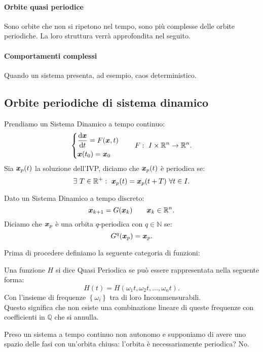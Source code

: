 \paragraph{Orbite quasi periodice}%
\label{par:Orbite quasi periodice}
Sono orbite che non si ripetono nel tempo, sono più complesse delle orbite periodiche. La loro struttura verrà approfondita nel seguito.
\paragraph{Comportamenti complessi}%
\label{par:Comportamenti complessi}
Quando un sistema presenta, ad esempio, caos deterministico.
\subsection{Orbite periodiche di sistema dinamico}%
\label{sub:Orbite periodiche di sistema dinamico}
\begin{defn}
Prendiamo un Sistema Dinamico a tempo continuo:
\[
    \begin{dcases}
	\frac{\text{d} \boldsymbol{x}}{\text{d} t} = F(\boldsymbol{x}, t)\\
	\boldsymbol{x} (t_0) = \boldsymbol{x}_0
    \end{dcases}
    \qquad
    F: \ I \times \mathbb{R}^n \to \mathbb{R}^n
.\] 
 Sia $\boldsymbol{x}_p(t)$ la soluzione dell'IVP, diciamo che $\boldsymbol{x}_p(t)$ è periodica se:
\[
    \exists \ T \in \mathbb{R}^+: \ \boldsymbol{x}_p(t) = \boldsymbol{x}_p (t + T) \  \forall t \in I
.\]    
\end{defn}
\noindent
\begin{defn}
    Dato un Sistema Dinamico a tempo discreto:
    \[
	\boldsymbol{x}_{k+1} = G(\boldsymbol{x}_k) \qquad \boldsymbol{x}_k \in \mathbb{R}^n
    .\] 
    Diciamo che $\boldsymbol{x}_p$ è una orbita $q$-periodica con $q \in \mathbb{N}$ se:
    \[
	G^{q} (\boldsymbol{x}_p) = \boldsymbol{x}_p
    .\] 
\end{defn}
\noindent
Prima di procedere definiamo la seguente categoria di funzioni:
\begin{defn}
    Una funzione $H$ si dice Quasi Periodica se può essere rappresentata nella seguente forma:
    \[
	H(t) = H(\omega_1t, \omega_2t, \ldots, \omega_nt)
    .\] 
    Con l'insieme di frequenze $\left\{\omega_i\right\}$ tra di loro Incommensurabili.\\
    Questo significa che non esiste una combinazione lineare di queste frequenze con coefficienti in $\mathbb{Q}$ che si annulla.
\end{defn}
\noindent
Preso un sistema a tempo continuo non autonomo e supponiamo di avere uno spazio delle fasi con un'orbita chiusa: l'orbita è necessariamente periodica? No.
